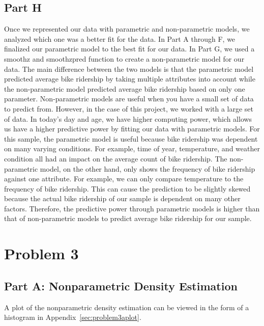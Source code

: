 \documentclass[11pt]{article}
\begin{document}
\subsection{Part H}
\label{subsec:2h}
Once we represented our data with parametric and non-parametric models, we analyzed which one was a better fit for the data. In Part A through F, we finalized our parametric model to the best fit for our data. In Part G, we used a smoothz and smoothzpred function to create a non-parametric model for our data. The main difference between the two models is that the parametric model predicted average bike ridership by taking multiple attributes into account while the non-parametric model predicted average bike ridership based on only one parameter. Non-parametric models are useful when you have a small set of data to predict from. However, in the case of this project, we worked with a large set of data. In today's day and age, we have higher computing power, which allows us have a higher predictive power by fitting our data with parametric models. For this sample, the parametric model is useful because bike ridership was dependent on many varying conditions. For example, time of year, temperature, and weather condition all had an impact on the average count of bike ridership. The non-parametric model, on the other hand, only shows the frequency of bike ridership against one attribute. For example, we can only compare  temperature to the frequency of bike ridership. This can cause the prediction to be slightly skewed because the actual bike ridership of our sample is dependent on many other factors. Therefore, the predictive power through parametric models is higher than that of non-parametric models to predict average bike ridership for our sample.

\pagebreak

\section{Problem 3}
\label{sec:problem3}
\subsection{Part A: Nonparametric Density Estimation}
\label{subsec:3a}
A plot of the nonparametric density estimation can be viewed in the form of a histogram in Appendix~\ref{sec:problem3aplot}.
\end{document}
